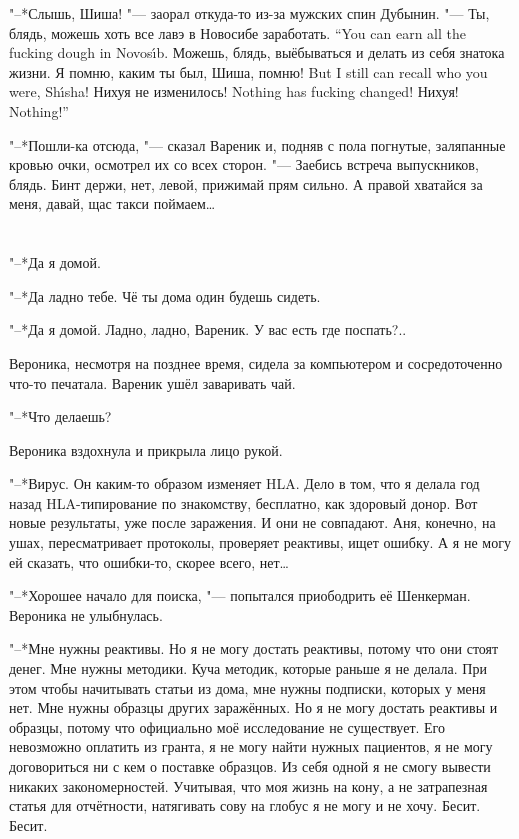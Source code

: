 "--*Слышь, Шиша! "--- заорал откуда-то из-за мужских спин Дубынин.
{"--- Ты, блядь, можешь хоть все лавэ в Новосибе заработать.}
{``You can earn all the fucking dough in Novos\'{\i}b.}
Можешь, блядь, выёбываться и делать из себя знатока жизни.
{Я помню, каким ты был, Шиша, помню!}
{But I still can recall who you were, Sh\'{\i}sha!}
{Нихуя не изменилось!}
{Nothing has fucking changed!}
{Нихуя!}
{Nothing!''}

"--*Пошли-ка отсюда, "--- сказал Вареник и, подняв с пола погнутые, заляпанные кровью очки, осмотрел их со всех сторон.
"--- Заебись встреча выпускников, блядь.
Бинт держи, нет, левой, прижимай прям сильно.
А правой хватайся за меня, давай, щас такси поймаем\ldots{}

\chapter{}

\label{Sun_2012_07_22}

"--*Да я домой.

"--*Да ладно тебе.
Чё ты дома один будешь сидеть.

"--*Да я домой.
Ладно, ладно, Вареник.
У вас есть где поспать?..

Вероника, несмотря на позднее время, сидела за компьютером и сосредоточенно что-то печатала.
Вареник ушёл заваривать чай.

"--*Что делаешь?

Вероника вздохнула и прикрыла лицо рукой.

"--*Вирус.
Он каким-то образом изменяет HLA.
Дело в том, что я делала год назад HLA-типирование по знакомству, бесплатно, как здоровый донор.
Вот новые результаты, уже после заражения.
И они не совпадают.
Аня, конечно, на ушах, пересматривает протоколы, проверяет реактивы, ищет ошибку.
А я не могу ей сказать, что ошибки-то, скорее всего, нет\ldots{}

"--*Хорошее начало для поиска, "--- попытался приободрить её Шенкерман.
Вероника не улыбнулась.

"--*Мне нужны реактивы.
Но я не могу достать реактивы, потому что они стоят денег.
Мне нужны методики.
Куча методик, которые раньше я не делала.
При этом чтобы начитывать статьи из дома, мне нужны подписки, которых у меня нет.
Мне нужны образцы других заражённых.
Но я не могу достать реактивы и образцы, потому что официально моё исследование не существует.
Его невозможно оплатить из гранта, я не могу найти нужных пациентов, я не могу договориться ни с кем о поставке образцов.
Из себя одной я не смогу вывести никаких закономерностей.
Учитывая, что моя жизнь на кону, а не затрапезная статья для отчётности, натягивать сову на глобус я не могу и не хочу.
Бесит.
Бесит.

